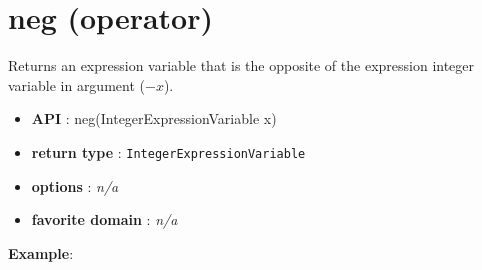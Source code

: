 \label{neg}
\hypertarget{neg}{}

\section{neg (operator)}\label{neg:negoperator}\hypertarget{neg:negoperator}{}

Returns an expression variable that is the opposite of the expression integer variable in argument (\(-x\)).

\begin{itemize}
	\item \textbf{API} : neg(IntegerExpressionVariable x)
	\item \textbf{return type} : \texttt{IntegerExpressionVariable}
	\item \textbf{options} : \emph{n/a}
	\item \textbf{favorite domain} : \emph{n/a}
\end{itemize}

\textbf{Example}:

